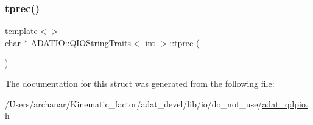 \mbox{\label{structADATIO_1_1QIOStringTraits_ac52b79fcc02bc184bbc1fb50b7dbf30c}} 
\subsubsection{\texorpdfstring{tprec()}{tprec()}\hspace{0.1cm}{\footnotesize\ttfamily [3/3]}}
{\footnotesize\ttfamily template$<$$>$ \\
char $\ast$ \mbox{\hyperlink{structADATIO_1_1QIOStringTraits}{A\+D\+A\+T\+I\+O\+::\+Q\+I\+O\+String\+Traits}}$<$ int $>$\+::tprec (\begin{DoxyParamCaption}{ }\end{DoxyParamCaption})}



The documentation for this struct was generated from the following file\+:\begin{DoxyCompactItemize}
\item 
/\+Users/archanar/\+Kinematic\+\_\+factor/adat\+\_\+devel/lib/io/do\+\_\+not\+\_\+use/\mbox{\hyperlink{adat__qdpio_8h}{adat\+\_\+qdpio.\+h}}\end{DoxyCompactItemize}
